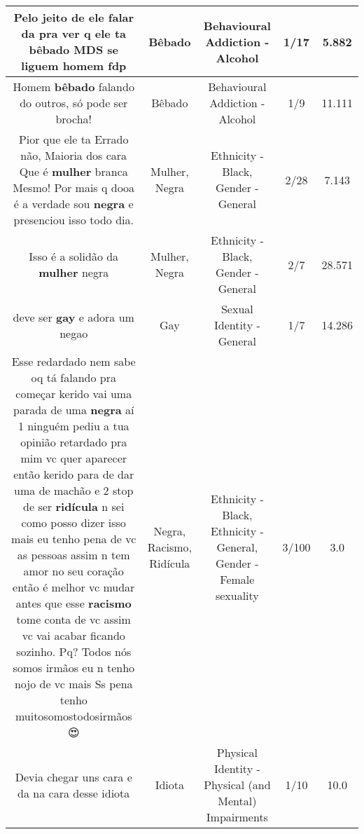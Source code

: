 \documentclass[11pt]{article}
\newlength\mylength
\begin{document}
\begin{center}
\begin{longtable}{|C{.65\mylength}|C{.30\mylength}|C{.12\mylength}|C{.12\mylength}|C{.12\mylength}|}
  \small Pelo jeito de ele falar da pra ver q ele ta \textbf{bêbado} MDS se liguem homem fdp\normalsize   & Bêbado & Behavioural Addiction - Alcohol & 1/17 & 5.882 \\  \hline
  \small Homem \textbf{bêbado} falando do outros, só pode ser brocha!\normalsize   & Bêbado & Behavioural Addiction - Alcohol & 1/9 & 11.111 \\  \hline
  \small Pior que ele ta Errado não,  Maioria  dos cara Que é \textbf{mulher} branca Mesmo!  Por mais q dooa é a verdade sou \textbf{negra} e presenciou isso todo dia.\normalsize   & Mulher, Negra & Ethnicity - Black, Gender - General & 2/28 & 7.143 \\  \hline
  \small Isso é a solidão da \textbf{mulher} negra\normalsize   & Mulher, Negra & Ethnicity - Black, Gender - General & 2/7 & 28.571 \\  \hline
  \small deve ser \textbf{gay} e adora um negao\normalsize   & Gay & Sexual Identity - General & 1/7 & 14.286 \\  \hline
  \small Esse redardado nem sabe oq tá falando pra começar kerido vai uma parada de uma \textbf{negra} aí 1 ninguém pediu a tua opinião retardado pra mim vc quer aparecer então kerido para de dar uma de machão e 2 stop de ser \textbf{ridícula} n sei como posso dizer isso mais eu tenho pena de vc as pessoas assim n tem amor no seu coração então é melhor vc mudar antes que esse \textbf{racismo} tome conta de vc assim vc vai acabar ficando sozinho. Pq? Todos nós somos irmãos eu n tenho nojo de vc mais Ss pena tenho muitosomostodosirmãos😍\normalsize   & Negra, Racismo, Ridícula & Ethnicity - Black, Ethnicity - General, Gender - Female sexuality & 3/100 & 3.0 \\  \hline
  \small Devia chegar uns cara e da na cara desse idiota\normalsize   & Idiota & Physical Identity - Physical (and Mental) Impairments & 1/10 & 10.0 \\  \hline

\end{longtable}
\end{center}
\end{document}
